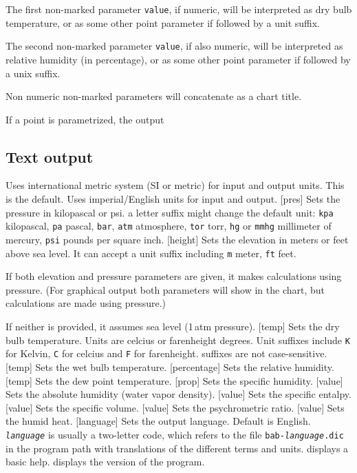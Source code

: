 \documentclass[letterpaper]{article}
\begin{document}
The first non-marked parameter \texttt{value}, if numeric, will be
interpreted as dry bulb temperature, or as some other point parameter
if followed by a unit suffix.

The second non-marked parameter \texttt{value}, if also numeric, will
be interpreted as relative humidity (in percentage), or as some other
point parameter if followed by a unix suffix.

Non numeric non-marked parameters will concatenate as a chart title.

If a point is parametrized, the output 

\subsection{Text output}
\begin{clioptions}
 Uses international metric system (SI or metric) for
  input and output units. This is the default.
 Uses imperial/English units for input and output.
[pres] Sets the pressure in kilopascal or psi.
  a letter suffix might change the default unit:
  \texttt{kpa} kilopascal, \texttt{pa} pascal, \texttt{bar}, \texttt{atm}
  atmosphere, \texttt{tor} torr, \texttt{hg} or \texttt{mmhg} millimeter
  of mercury, \texttt{psi} pounds per square inch.
[height] Sets the elevation in meters or feet
  above sea level. It can accept a unit suffix including \texttt{m} meter,
  \texttt{ft} feet.

If both elevation and pressure parameters are given, it makes calculations
using pressure. (For graphical output both parameters will show in the
chart, but calculations are made using pressure.)

If neither is provided, it assumes sea level (1\,atm pressure).
[temp] Sets the dry bulb temperature. Units are celcius
  or farenheight degrees. Unit suffixes include \texttt{K} for Kelvin,
  \texttt{C} for celcius and \texttt{F} for farenheight. suffixes are not
  case-sensitive.
[temp] Sets the wet bulb temperature.
[percentage] Sets the relative humidity.
[temp] Sets the dew point temperature.
[prop] Sets the specific humidity.
[value] Sets the absolute humidity (water vapor density).
[value] Sets the specific entalpy.
[value] Sets the specific volume.
[value] Sets the psychrometric ratio.
[value] Sets the humid heat.
[language] Sets the output language. Default is English.
  \texttt{\textit{language}} is usually a two-letter code, which refers
  to the file \texttt{bab-\textit{language}.dic} in the program path
  with translations of the different terms and units.
 displays a basic help.
 displays the version of the program.
\end{clioptions}
\end{document}

